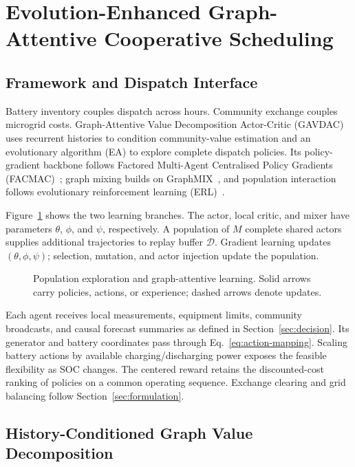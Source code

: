 \section{Evolution-Enhanced Graph-Attentive Cooperative Scheduling}
\label{sec:method}

\subsection{Framework and Dispatch Interface}
\label{sec:method-framework}
\label{sec:dispatch-interface}

Battery inventory couples dispatch across hours. Community exchange
couples microgrid costs. Graph-Attentive Value
Decomposition Actor-Critic (GAVDAC) uses recurrent histories to condition
community-value estimation and an evolutionary algorithm (EA) to explore
complete dispatch policies. Its policy-gradient backbone follows Factored
Multi-Agent Centralised Policy Gradients (FACMAC)~\cite{facmac2021};
graph mixing builds on GraphMIX~\cite{graphmix2020}, and population
interaction follows evolutionary reinforcement learning (ERL)~\cite{erl2018}.

Figure~\ref{fig:method-framework} shows the two learning branches.
The actor, local critic, and mixer have parameters $\theta$, $\phi$, and
$\psi$, respectively. A population of $M$ complete shared actors supplies
additional trajectories to replay buffer $\mathcal D$. Gradient learning
updates $(\theta,\phi,\psi)$; selection, mutation, and actor injection
update the population.

\begin{figure}[htbp]
 \centering
 
 \caption{Population exploration and graph-attentive learning. Solid arrows
 carry policies, actions, or experience; dashed arrows denote updates.}
 \label{fig:method-framework}
\end{figure}

Each agent receives local measurements, equipment limits, community
broadcasts, and causal forecast summaries as defined in
Section~\ref{sec:decision}. Its generator and battery coordinates pass
through Eq.~\eqref{eq:action-mapping}. Scaling battery actions by available
charging/discharging power exposes the feasible flexibility as SOC changes.
The centered reward retains the discounted-cost ranking of policies on
a common operating sequence. Exchange clearing and grid balancing follow
Section~\ref{sec:formulation}.

\subsection{History-Conditioned Graph Value Decomposition}
\label{sec:graph-decomposition}

